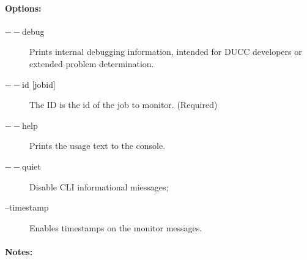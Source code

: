     \paragraph{Options:}
    \begin{description}
        \item[$--$debug ]          
          Prints internal debugging information, intended for DUCC developers or extended problem determination.
        \item[$--$id {[jobid]}]
          The ID is the id of the job to monitor. (Required)
        \item[$--$help]
          Prints the usage text to the console. 
        \item[$--$quiet] 
          Disable CLI informational miessages;
        \item[--timestamp]
          Enables timestamps on the monitor messages.
     \end{description}
        
    \paragraph{Notes:}
